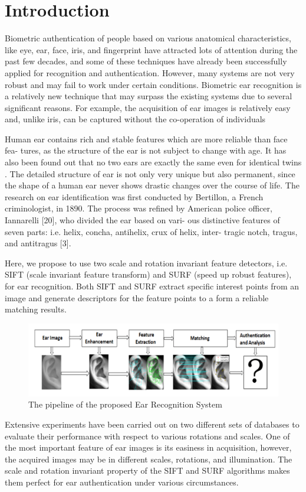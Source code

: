 \chapter{Introduction} \label{sec:intro} Biometric authentication of people based on various anatomical characteristics, like eye, ear, face, iris, and fingerprint have attracted lots of attention during the past few decades, and some of these techniques have already been successfully applied for recognition and authentication. However, many systems are not very robust and may fail to work under certain conditions. Biometric ear recognition is a relatively new technique that may surpass the existing systems due to several significant reasons. For example, the acquisition of ear images is relatively easy and, unlike iris, can be captured without the co-operation of individuals \cite{pflug2012ear}

Human ear contains rich and stable features which are more reliable than face fea- tures, as the structure of the ear is not subject to change with age. It has also been found out that no two ears are exactly the same even for identical twins \cite{abaza}. The detailed structure of ear is not only very unique but also permanent, since the shape of a human ear never shows drastic changes over the course of life. The research on ear identification was first conducted by Bertillon, a French criminologist, in 1890. The process was refined by American police officer, Iannarelli [20], who divided the ear based on vari- ous distinctive features of seven parts: i.e. helix, concha, antihelix, crux of helix, inter- tragic notch, tragus, and antitragus [3].

Here, we propose to use two scale and rotation invariant feature detectors, i.e. SIFT (scale invariant feature transform) and SURF (speed up robust features), for ear recognition. Both SIFT and SURF extract specific interest points from an image and generate descriptors for the feature points to a form a reliable matching results.\\
\begin{figure}[t]
	\includegraphics[width=\textwidth]{Figures/Figure1}
	\caption{The pipeline of the proposed Ear Recognition System}
	\label{fig:Figure1}
\end{figure}
Extensive experiments have been carried out on two different sets of databases to evaluate their performance with respect to various rotations and scales. One of the most important feature of ear images is its easiness in acquisition, however, the acquired images may be in different scales, rotations, and illumination. The scale and rotation invariant property of the SIFT and SURF algorithms makes them perfect for ear authentication under various circumstances.

